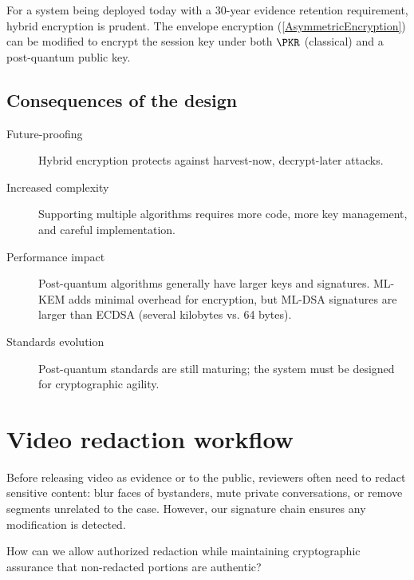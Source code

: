 For a system being deployed today with a 30-year evidence retention 
requirement, hybrid encryption is prudent.
The envelope encryption (\cref{AsymmetricEncryption}) can be modified to 
encrypt the session key under both \(\PKR\) (classical) and a post-quantum 
public key.

\subsection{Consequences of the design}

\begin{description}
  \item[Future-proofing] Hybrid encryption protects against harvest-now, 
    decrypt-later attacks.
  \item[Increased complexity] Supporting multiple algorithms requires more 
    code, more key management, and careful implementation.
  \item[Performance impact] Post-quantum algorithms generally have larger keys 
    and signatures.
    ML-KEM adds minimal overhead for encryption, but ML-DSA signatures are 
    larger than ECDSA (several kilobytes vs. 64 bytes).
  \item[Standards evolution] Post-quantum standards are still maturing; the 
    system must be designed for cryptographic agility.
\end{description}


\section{Video redaction workflow}\label{Redaction}


Before releasing video as evidence or to the public, reviewers often need to 
redact sensitive content: blur faces of bystanders, mute private conversations, 
or remove segments unrelated to the case.
However, our signature chain ensures any modification is detected.

\begin{exercise}
  How can we allow authorized redaction while maintaining cryptographic 
  assurance that non-redacted portions are authentic?
\end{exercise}

